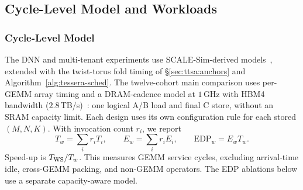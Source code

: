 



\subsection{Cycle-Level Model and Workloads}
\label{sec:method:cycle}
\subsubsection{Cycle-Level Model}
The DNN and multi-tenant experiments use
SCALE-Sim-derived models~\cite{samajdar2020systematic}, extended with the
twist-torus fold timing of \S\ref{sec:ttsa:anchors} and
Algorithm~\ref{alg:tessera-sched}. The twelve-cohort main comparison
uses per-GEMM array timing and a DRAM-cadence model at $1$\,GHz with
HBM4 bandwidth ($2.8$\,TB/s)~\cite{micronhbm}: one logical A/B load and final C store,
without an SRAM capacity limit. Each design uses its own configuration
rule for each stored $(M,N,K)$. With invocation count $r_i$, we report
\begin{equation}
 T_w=\sum_i r_i T_i,\qquad E_w=\sum_i r_i E_i,\qquad
 \mathrm{EDP}_w=E_w T_w.
 \label{eq:workload-service}
\end{equation}
Speed-up is $T_{\rm WS}/T_w$. This measures GEMM service cycles, excluding
arrival-time idle, cross-GEMM packing, and non-GEMM operators. The EDP
ablations below use a separate capacity-aware model.

